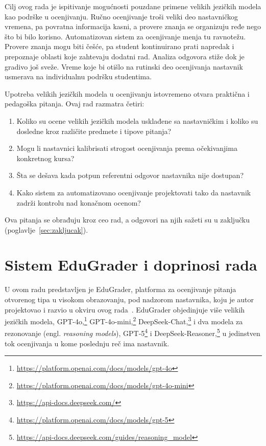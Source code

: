 Cilj ovog rada je ispitivanje mogućnosti pouzdane primene velikih jezičkih modela kao podrške u ocenjivanju.
Ručno ocenjivanje troši veliki deo nastavničkog vremena, pa povratna informacija kasni,
a provere znanja se organizuju ređe nego što bi bilo korisno.
Automatizovan sistem za ocenjivanje menja tu ravnotežu.
Provere znanja mogu biti češće, pa student kontinuirano prati napredak i prepoznaje oblasti koje zahtevaju dodatni rad.
Analiza odgovora stiže dok je gradivo još sveže.
Vreme koje bi otišlo na rutinski deo ocenjivanja nastavnik usmerava na individualnu podršku studentima.

Upotreba velikih jezičkih modela u ocenjivanju istovremeno otvara praktična i pedagoška pitanja.
Ovaj rad razmatra četiri:
\begin{enumerate}
    \item Koliko su ocene velikih jezičkih modela usklađene sa nastavničkim i koliko su dosledne kroz različite predmete i tipove pitanja?
    \item Mogu li nastavnici kalibrisati strogost ocenjivanja prema očekivanjima konkretnog kursa?
    \item Šta se dešava kada potpun referentni odgovor nastavnika nije dostupan?
    \item Kako sistem za automatizovano ocenjivanje projektovati tako da nastavnik zadrži kontrolu nad konačnom ocenom?
\end{enumerate}
Ova pitanja se obrađuju kroz ceo rad, a odgovori na njih sažeti su u zaključku (poglavlje~\ref{sec:zakljucak}).

\section{Sistem EduGrader i doprinosi rada}

U ovom radu predstavljen je EduGrader, platforma za ocenjivanje pitanja otvorenog tipa u visokom obrazovanju, pod nadzorom nastavnika,
koju je autor projektovao i razvio u okviru ovog rada~\cite{ikovic2025edugraderconf,ikovic2025edugrader,ikovic2026edugraderrepo}.
EduGrader objedinjuje više velikih jezičkih modela,
GPT-4o,\footnote{\url{https://platform.openai.com/docs/models/gpt-4o}}
GPT-4o-mini,\footnote{\url{https://platform.openai.com/docs/models/gpt-4o-mini}}
DeepSeek-Chat,\footnote{\url{https://api-docs.deepseek.com/}} i dva modela za rezonovanje (engl. \emph{reasoning models}),
GPT-5\footnote{\url{https://platform.openai.com/docs/models/gpt-5}}
i DeepSeek-Reasoner,\footnote{\url{https://api-docs.deepseek.com/guides/reasoning\_model}}
u jedinstven tok ocenjivanja u kome poslednju reč ima nastavnik.

